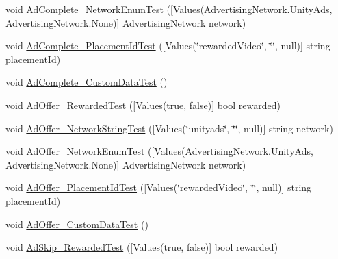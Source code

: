 \begin{DoxyCompactItemize}
\item 
void \mbox{\hyperlink{class_unity_engine_1_1_analytics_1_1_tests_1_1_analytics_event_tests_a3da0665204502c88897795761a90d8e2}{Ad\+Complete\+\_\+\+Network\+Enum\+Test}} (\mbox{[}Values(Advertising\+Network.\+Unity\+Ads, Advertising\+Network.\+None)\mbox{]} Advertising\+Network network)
\item 
void \mbox{\hyperlink{class_unity_engine_1_1_analytics_1_1_tests_1_1_analytics_event_tests_a12bd127c008a917eb0995432194d3644}{Ad\+Complete\+\_\+\+Placement\+Id\+Test}} (\mbox{[}Values(\char`\"{}rewarded\+Video\char`\"{}, \char`\"{}\char`\"{}, null)\mbox{]} string placement\+Id)
\item 
void \mbox{\hyperlink{class_unity_engine_1_1_analytics_1_1_tests_1_1_analytics_event_tests_af6059ac59afe9513636569c8042b223b}{Ad\+Complete\+\_\+\+Custom\+Data\+Test}} ()
\item 
void \mbox{\hyperlink{class_unity_engine_1_1_analytics_1_1_tests_1_1_analytics_event_tests_a4a41b377e3f6606d815169c02105d2a9}{Ad\+Offer\+\_\+\+Rewarded\+Test}} (\mbox{[}Values(true, false)\mbox{]} bool rewarded)
\item 
void \mbox{\hyperlink{class_unity_engine_1_1_analytics_1_1_tests_1_1_analytics_event_tests_ae7f9fbc24f859f79b04e0374b9c22c18}{Ad\+Offer\+\_\+\+Network\+String\+Test}} (\mbox{[}Values(\char`\"{}unityads\char`\"{}, \char`\"{}\char`\"{}, null)\mbox{]} string network)
\item 
void \mbox{\hyperlink{class_unity_engine_1_1_analytics_1_1_tests_1_1_analytics_event_tests_af34ca4d6ec550988a9792420948087d5}{Ad\+Offer\+\_\+\+Network\+Enum\+Test}} (\mbox{[}Values(Advertising\+Network.\+Unity\+Ads, Advertising\+Network.\+None)\mbox{]} Advertising\+Network network)
\item 
void \mbox{\hyperlink{class_unity_engine_1_1_analytics_1_1_tests_1_1_analytics_event_tests_ae61a340e6b2924383cd6353b7d64aed0}{Ad\+Offer\+\_\+\+Placement\+Id\+Test}} (\mbox{[}Values(\char`\"{}rewarded\+Video\char`\"{}, \char`\"{}\char`\"{}, null)\mbox{]} string placement\+Id)
\item 
void \mbox{\hyperlink{class_unity_engine_1_1_analytics_1_1_tests_1_1_analytics_event_tests_a15fa4b827793c85490ea3c5f595261b2}{Ad\+Offer\+\_\+\+Custom\+Data\+Test}} ()
\item 
void \mbox{\hyperlink{class_unity_engine_1_1_analytics_1_1_tests_1_1_analytics_event_tests_aabc0f1962340a2f4ad78d43f9ddc5442}{Ad\+Skip\+\_\+\+Rewarded\+Test}} (\mbox{[}Values(true, false)\mbox{]} bool rewarded)
\item 

\end{DoxyCompactItemize}
